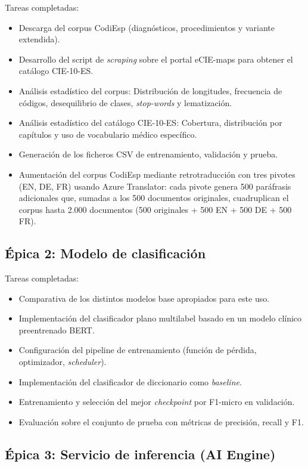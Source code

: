 Tareas completadas:
\begin{itemize}[noitemsep]
 \item Descarga del corpus CodiEsp (diagnósticos, procedimientos y variante extendida).
 \item Desarrollo del script de \emph{scraping} sobre el portal eCIE-maps para obtener el catálogo CIE-10-ES.
 \item Análisis estadístico del corpus: Distribución de longitudes, frecuencia de códigos, desequilibrio de clases, \emph{stop-words} y lematización.
 \item Análisis estadístico del catálogo CIE-10-ES: Cobertura, distribución por capítulos y uso de vocabulario médico específico.
 \item Generación de los ficheros CSV de entrenamiento, validación y prueba.
 \item Aumentación del corpus CodiEsp mediante retrotraducción con tres pivotes (EN, DE, FR) usando Azure Translator: cada pivote genera 500 paráfrasis adicionales que, sumadas a los 500 documentos originales, cuadruplican el corpus hasta 2.000 documentos (500 originales + 500 EN + 500 DE + 500 FR).
\end{itemize}

\subsection{Épica 2: Modelo de clasificación}

Tareas completadas:
\begin{itemize}[noitemsep]
 \item Comparativa de los distintos modelos base apropiados para este uso.
 \item Implementación del clasificador plano multilabel basado en un modelo clínico preentrenado BERT.
 \item Configuración del pipeline de entrenamiento (función de pérdida, optimizador, \emph{scheduler}).
 \item Implementación del clasificador de diccionario como \emph{baseline}.
 \item Entrenamiento y selección del mejor \emph{checkpoint} por F1-micro en validación.
 \item Evaluación sobre el conjunto de prueba con métricas de precisión, recall y F1.
\end{itemize}

\subsection{Épica 3: Servicio de inferencia (AI Engine)}

